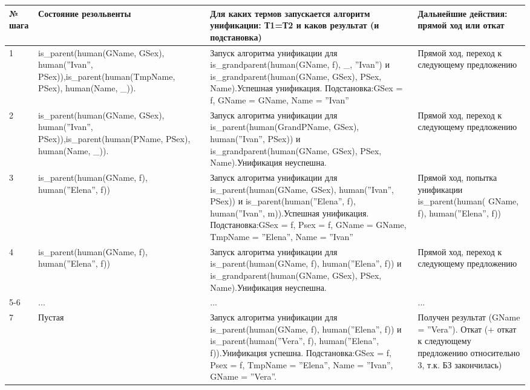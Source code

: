 \documentclass[12pt]{report}
\begin{document}
\begin{table}[H]
	\begin{center}
		\begin{tabular}{|p{1 cm}|p{5 cm}|p{8.5 cm}|p{4 cm}|}
			\hline
			№ шага & Состояние резольвенты & Для каких термов запускается алгоритм унификации: Т1=Т2 и каков результат (и подстановка) & Дальнейшие действия: прямой ход или откат \\
			\hline 
			1 & is\_parent(human(GName, GSex), human(''Ivan'', PSex)),\newline is\_parent(human(TmpName, PSex), human(Name, \_)).  & Запуск алгоритма унификации для is\_grandparent(human(GName, f), \_, ''Ivan'') и is\_grandparent(human(GName, GSex), PSex, Name).\newline Успешная унификация. Подстановка:\newline GSex = f,  GName = GName, Name = ''Ivan'' & Прямой ход, переход к следующему предложению \\
			\hline 
			2 & is\_parent(human(GName, GSex), human(''Ivan'', PSex)),\newline is\_parent(human(PName, PSex), human(Name, \_)). & Запуск алгоритма унификации для is\_parent(human(GrandPName, GSex), human(''Ivan'', PSex)) и is\_grandparent(human(GName, GSex), PSex, Name).\newline Унификация неуспешна. & Прямой ход, переход к следующему предложению  \\
			\hline 
			3 & is\_parent(human(GName, f), human(''Elena'', f))  & Запуск алгоритма унификации для is\_parent(human(GName, GSex), human(''Ivan'', PSex)) и is\_parent(human(''Elena'', f), human(''Ivan'', m)).\newline Успешная унификация. Подстановка:\newline GSex = f, Psex = f, GName = GName, TmpName = ''Elena'', Name = ''Ivan'' & Прямой ход, попытка унификации is\_parent(human( GName, f), human(''Elena'', f)) \\
			\hline 
			4 & is\_parent(human(GName, f), human(''Elena'', f)) & Запуск алгоритма унификации для is\_parent(human(GName, f), human(''Elena'', f)) и is\_grandparent(human(GName, GSex), PSex, Name).\newline Унификация неуспешна. & Прямой ход, переход к следующему предложению \\
			\hline 
			5-6 & ... & ... & ... \\
			\hline 
			7 & Пустая & Запуск алгоритма унификации для is\_parent(human(GName, f), human(''Elena'', f))
			и is\_parent(human(''Vera'', f), human(''Elena'', f)).\newline Унификация успешна. Подстановка:\newline GSex = f, Psex = f, TmpName = ''Elena'', Name = ''Ivan'', GName = ''Vera''. & Получен результат (GName = ''Vera''). Откат (+ откат к следующему предложению относительно 3, т.к. БЗ закончилась) \\

\end{tabular}
\end{center}
\end{table}
\end{document}
